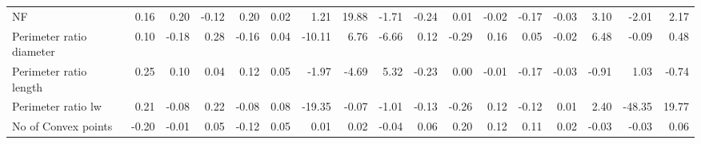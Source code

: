 \documentclass{article}
\begin{document}
\begin{table}[!ht]
{\begin{tabular}{lrrrrrrrrrrrrrrrr}
NF                                                                      & 0.16                     & 0.20                     & -0.12                    & 0.20                     & 0.02                     & 1.21                     & 19.88                    & -1.71                    & -0.24                    & 0.01                     & -0.02                    & -0.17                    & -0.03                    & 3.10                     & -2.01                    & 2.17                     \\
Perimeter ratio diameter                                                & 0.10                     & -0.18                    & 0.28                     & -0.16                    & 0.04                     & -10.11                   & 6.76                     & -6.66                    & 0.12                     & -0.29                    & 0.16                     & 0.05                     & -0.02                    & 6.48                     & -0.09                    & 0.48                     \\
Perimeter ratio length                                                  & 0.25                     & 0.10                     & 0.04                     & 0.12                     & 0.05                     & -1.97                    & -4.69                    & 5.32                     & -0.23                    & 0.00                     & -0.01                    & -0.17                    & -0.03                    & -0.91                    & 1.03                     & -0.74                    \\
Perimeter ratio lw                                                      & 0.21                     & -0.08                    & 0.22                     & -0.08                    & 0.08                     & -19.35                   & -0.07                    & -1.01                    & -0.13                    & -0.26                    & 0.12                     & -0.12                    & 0.01                     & 2.40                     & -48.35                   & 19.77                    \\
No of Convex points                                                     & -0.20                    & -0.01                    & 0.05                     & -0.12                    & 0.05                     & 0.01                     & 0.02                     & -0.04                    & 0.06                     & 0.20                     & 0.12                     & 0.11                     & 0.02                     & -0.03                    & -0.03                    & 0.06                     \\

\end{tabular}}
\end{table}
\end{document}

